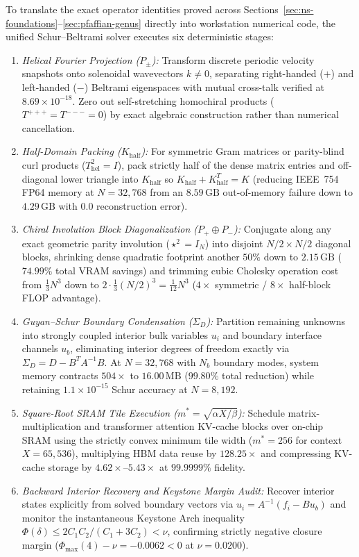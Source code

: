 \documentclass[10pt]{article}
\renewcommand{\_}{\OrigUnderscore\hspace{0pt}}
\numberwithin{equation}{section}
\begin{document}
To translate the exact operator identities proved across Sections~\ref{sec:ns-foundations}--\ref{sec:pfaffian-genus} directly into workstation numerical code, the unified Schur--Beltrami solver executes six deterministic stages:
\begin{enumerate}
\item \emph{Helical Fourier Projection ($P_\pm$):} Transform discrete periodic velocity snapshots onto solenoidal wavevectors $k \neq 0$, separating right-handed ($+$) and left-handed ($-$) Beltrami eigenspaces with mutual cross-talk verified at $8.69\times 10^{-18}$. Zero out self-stretching homochiral products ($T^{+++} = T^{---} = 0$) by exact algebraic construction rather than numerical cancellation.
\item \emph{Half-Domain Packing ($K_{\mathrm{half}}$):} For symmetric Gram matrices or parity-blind curl products ($T_{\mathrm{hel}}^2 = I$), pack strictly half of the dense matrix entries and off-diagonal lower triangle into $K_{\mathrm{half}}$ so $K_{\mathrm{half}} + K_{\mathrm{half}}^T = K$ (reducing IEEE~754 FP64 memory at $N = 32{,}768$ from an $8.59\,\mathrm{GB}$ out-of-memory failure down to $4.29\,\mathrm{GB}$ with $0.0$ reconstruction error).
\item \emph{Chiral Involution Block Diagonalization ($P_+ \oplus P_-$):} Conjugate along any exact geometric parity involution ($\star^2 = I_N$) into disjoint $N/2 \times N/2$ diagonal blocks, shrinking dense quadratic footprint another $50\%$ down to $2.15\,\mathrm{GB}$ ($74.99\%$ total VRAM savings) and trimming cubic Cholesky operation cost from $\frac{1}{3}N^3$ down to $2\cdot\frac{1}{3}(N/2)^3 = \frac{1}{12}N^3$ ($4\times$ symmetric / $8\times$ half-block FLOP advantage).
\item \emph{Guyan--Schur Boundary Condensation ($\Sigma_D$):} Partition remaining unknowns into strongly coupled interior bulk variables $u_i$ and boundary interface channels $u_b$, eliminating interior degrees of freedom exactly via $\Sigma_D = D - B^T A^{-1}B$. At $N = 32{,}768$ with $N_b$ boundary modes, system memory contracts $504\times$ to $16.00\,\mathrm{MB}$ ($99.80\%$ total reduction) while retaining $1.1\times 10^{-15}$ Schur accuracy at $N = 8{,}192$.
\item \emph{Square-Root SRAM Tile Execution ($m^* = \sqrt{\alpha X/\beta}$):} Schedule matrix-multiplication and transformer attention KV-cache blocks over on-chip SRAM using the strictly convex minimum tile width ($m^* = 256$ for context $X = 65{,}536$), multiplying HBM data reuse by $128.25\times$ and compressing KV-cache storage by $4.62\times$--$5.43\times$ at $99.9999\%$ fidelity.
\item \emph{Backward Interior Recovery and Keystone Margin Audit:} Recover interior states explicitly from solved boundary vectors via $u_i = A^{-1}(f_i - B u_b)$ and monitor the instantaneous Keystone Arch inequality $\Phi(\delta) \le 2C_1 C_2/(C_1 + 3C_2) < \nu$, confirming strictly negative closure margin ($\Phi_{\max}(4) - \nu = -0.0062 < 0$ at $\nu = 0.0200$).
\end{enumerate}
\end{document}
